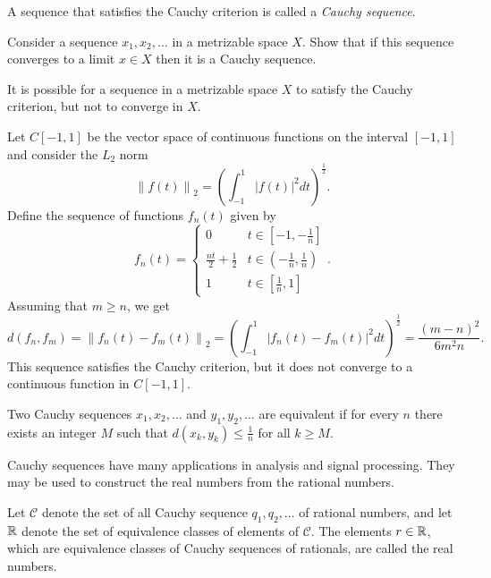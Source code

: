 A sequence that satisfies the Cauchy criterion is called a \emph{Cauchy sequence}.

\begin{problem}
Consider a sequence $x_1, x_2, \ldots$ in a metrizable space $X$.
Show that if this sequence converges to a limit $x \in X$ then it is a Cauchy sequence.
\end{problem}

It is possible for a sequence in a metrizable space $X$ to satisfy the Cauchy criterion, but not to converge in $X$.

\begin{example}
Let $C[-1,1]$ be the vector space of continuous functions on the interval $[-1,1]$ and consider the $L_2$ norm
\begin{equation*}
\left\| f(t) \right\|_2 = \left( \int_{-1}^1 |f(t)|^2 dt \right)^{\frac{1}{2}}.
\end{equation*}
Define the sequence of functions $f_n(t)$ given by
\begin{equation*}
f_n(t) = \left\{ \begin{array}{ll}
0 & t \in \left[ -1, -\frac{1}{n} \right] \\
\frac{nt}{2} + \frac{1}{2} & t \in \left( -\frac{1}{n}, \frac{1}{n} \right) \\
1 & t \in \left[ \frac{1}{n}, 1 \right]
\end{array} \right. .
\end{equation*}
Assuming that $m \geq n$, we get
\begin{equation*}
d(f_n, f_m) = \left\| f_n(t) - f_m(t) \right\|_2
= \left( \int_{-1}^1 |f_n(t) - f_m(t)|^2 dt \right)^{\frac{1}{2}}
= \frac{(m-n)^2}{6m^2n}.
\end{equation*}
This sequence satisfies the Cauchy criterion, but it does not converge to a continuous function in $C[-1,1]$.
\end{example}

\begin{definition}
Two Cauchy sequences $x_1, x_2, \ldots$ and $y_1, y_2, \ldots$ are equivalent if for every $n$ there exists an integer $M$ such that $d (x_k, y_k) \leq \frac{1}{n}$ for all $k \geq M$.
\end{definition}

Cauchy sequences have many applications in analysis and signal processing.
They may be used to construct the real numbers from the rational numbers.

\begin{definition}
Let $\mathcal{C}$ denote the set of all Cauchy sequence $q_1, q_2, \ldots$ of rational numbers, and let $\mathbb{R}$ denote the set of equivalence classes of elements of $\mathcal{C}$.
The elements $r \in \mathbb{R}$, which are equivalence classes of Cauchy sequences of rationals, are called the real numbers.
\end{definition}

